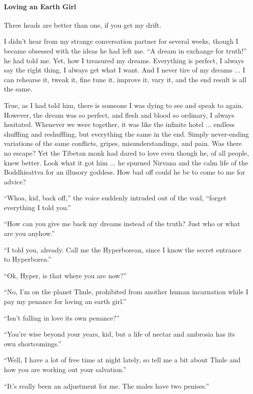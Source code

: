 \paragraph{Loving an Earth Girl}

Three heads are better than one, if you get my drift.

I didn't hear from my strange conversation partner for several weeks, though I became obsessed with the ideas he had left me. ``A dream in exchange for truth!'' he had told me. Yet, how I treasured my dreams. Everything is perfect, I always say the right thing, I always get what I want. And I never tire of my dreams ... I can rehearse it, tweak it, fine tune it, improve it, vary it, and the end result is all the same.

True, as I had told him, there is someone I was dying to see and speak to again. However, the dream was so perfect, and flesh and blood so ordinary, I always hesitated. Whenever we were together, it was like the infinite hotel ... endless shuffling and reshuffling, but everything the same in the end. Simply never-ending variations of the same conflicts, gripes, misunderstandings, and pain. Was there no escape? Yet the Tibetan monk had dared to love even though he, of all people, knew better. Look what it got him ... he spurned Nirvana and the calm life of the Boddhisattva for an illusory goddess. How bad off could he be to come to me for advice?

``Whoa, kid, back off,'' the voice suddenly intruded out of the void, ``forget everything I told you.''

``How can you give me back my dreams instead of the truth? Just who or what are you anyhow.''

``I told you, already. Call me the Hyperborean, since I know the secret entrance to Hyperborea.''

``Ok, Hyper, is that where you are now?''

``No, I'm on the planet Thule, prohibited from another human incarnation while I pay my penance for loving an earth girl.''

``Isn't falling in love its own penance?''

``You're wise beyond your years, kid, but a life of nectar and ambrosia has its own shortcomings.''

``Well, I have a lot of free time at night lately, so tell me a bit about Thule and how you are working out your salvation.''

``It's really been an adjustment for me. The males have two penises.''

